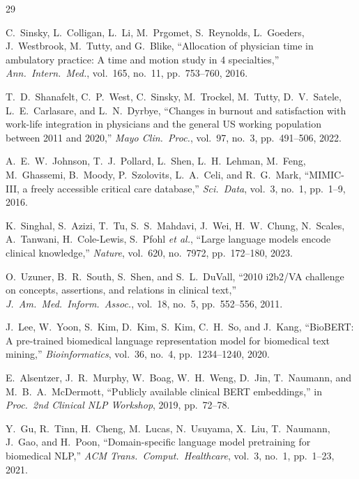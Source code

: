 \documentclass[conference]{IEEEtran}
\begin{document}

\begin{thebibliography}{29}

C.~Sinsky, L.~Colligan, L.~Li, M.~Prgomet, S.~Reynolds, L.~Goeders,
J.~Westbrook, M.~Tutty, and G.~Blike,
``Allocation of physician time in ambulatory practice: A time and motion study
in 4 specialties,''
\emph{Ann.\ Intern.\ Med.}, vol.~165, no.~11, pp.~753--760, 2016.

T.~D.~Shanafelt, C.~P.~West, C.~Sinsky, M.~Trockel, M.~Tutty, D.~V.~Satele,
L.~E.~Carlasare, and L.~N.~Dyrbye,
``Changes in burnout and satisfaction with work-life integration in physicians
and the general US working population between 2011 and 2020,''
\emph{Mayo Clin.\ Proc.}, vol.~97, no.~3, pp.~491--506, 2022.

A.~E.~W.~Johnson, T.~J.~Pollard, L.~Shen, L.~H.~Lehman, M.~Feng,
M.~Ghassemi, B.~Moody, P.~Szolovits, L.~A.~Celi, and R.~G.~Mark,
``MIMIC-III, a freely accessible critical care database,''
\emph{Sci.\ Data}, vol.~3, no.~1, pp.~1--9, 2016.

K.~Singhal, S.~Azizi, T.~Tu, S.~S.~Mahdavi, J.~Wei, H.~W.~Chung,
N.~Scales, A.~Tanwani, H.~Cole-Lewis, S.~Pfohl \emph{et al.},
``Large language models encode clinical knowledge,''
\emph{Nature}, vol.~620, no.~7972, pp.~172--180, 2023.

O.~Uzuner, B.~R.~South, S.~Shen, and S.~L.~DuVall,
``2010 i2b2/VA challenge on concepts, assertions, and relations in clinical
text,''
\emph{J.\ Am.\ Med.\ Inform.\ Assoc.}, vol.~18, no.~5, pp.~552--556, 2011.

J.~Lee, W.~Yoon, S.~Kim, D.~Kim, S.~Kim, C.~H.~So, and J.~Kang,
``BioBERT: A pre-trained biomedical language representation model for
biomedical text mining,''
\emph{Bioinformatics}, vol.~36, no.~4, pp.~1234--1240, 2020.

E.~Alsentzer, J.~R.~Murphy, W.~Boag, W.~H.~Weng, D.~Jin, T.~Naumann,
and M.~B.~A.~McDermott,
``Publicly available clinical BERT embeddings,''
in \emph{Proc.\ 2nd Clinical NLP Workshop}, 2019, pp.~72--78.

Y.~Gu, R.~Tinn, H.~Cheng, M.~Lucas, N.~Usuyama, X.~Liu, T.~Naumann,
J.~Gao, and H.~Poon,
``Domain-specific language model pretraining for biomedical NLP,''
\emph{ACM Trans.\ Comput.\ Healthcare}, vol.~3, no.~1, pp.~1--23, 2021.


\end{thebibliography}
\end{document}
